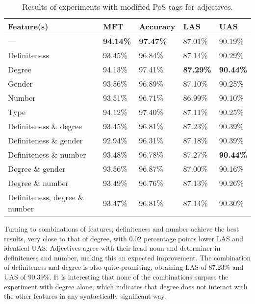 \documentclass[a4paper,12pt,english]{book}
\begin{document}
\begin{table}
    \centering
    \smaller[0.5]
    \begin{tabular}{@{}lllll@{}}
        \toprule
        \textbf{Feature(s)} & \textbf{MFT} & \textbf{Accuracy} &
        \textbf{LAS} & \textbf{UAS} \\
        \midrule
        --- & \textbf{94.14\%} & \textbf{97.47\%} & 87.01\% & 90.19\% \\
        Definiteness & 93.45\% & 96.84\% & 87.14\% & 90.29\% \\
        Degree & 94.13\% & 97.41\% & \textbf{87.29\%} & \textbf{90.44\%} \\
        Gender & 93.56\% & 96.89\% & 87.10\% & 90.25\% \\
        Number & 93.51\% & 96.71\% & 86.99\% & 90.10\% \\
        Type & 94.12\% & 97.40\% & 87.11\% & 90.25\% \\
        Definiteness \& degree & 93.45\% & 96.81\% & 87.23\% & 90.39\% \\
        Definiteness \& gender & 92.94\% & 96.31\% & 87.18\% & 90.39\% \\
        Definiteness \& number & 93.48\% & 96.78\% & 87.27\% &
        \textbf{90.44\%} \\
        Degree \& gender & 93.56\% & 96.87\% & 87.00\% & 90.16\% \\
        Degree \& number & 93.49\% & 96.76\% & 87.13\% & 90.26\% \\
        Definiteness, degree \& number & 93.47\% & 96.81\% & 87.14\% & 90.30\% \\
        \bottomrule
    \end{tabular}
    \caption{Results of experiments with modified PoS tags for adjectives.}
    \label{adjresults}
\end{table}

Turning to combinations of features, definiteness and number achieve the best
results, very close to that of degree, with 0.02 percentage points lower LAS
and identical UAS. Adjectives agree with their head noun and determiner in
definiteness and number, making this an expected improvement. The combination
of definiteness and degree is also quite promising, obtaining LAS of 87.23\%
and UAS of 90.39\%. It is interesting that none of the combinations surpass the
experiment with degree alone, which indicates that degree does not interact
with the other features in any syntactically significant way.
\end{document}

